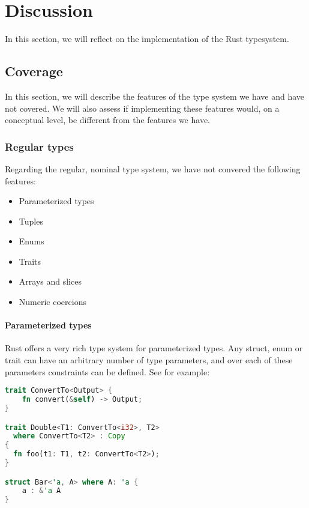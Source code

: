 \section{Discussion}\label{s:discussion}


In this section, we will reflect on the implementation of the Rust typesystem.

\subsection{Coverage}

In this section, we will describe the features of the type system we have and have not covered. We will also assess if implementing these features would, on a conceptual level, be different from the features we have.

\subsubsection{Regular types}

Regarding the regular, nominal type system, we have not convered the following features:

\begin{itemize}
	\item Parameterized types
	\item Tuples
	\item Enums
	\item Traits
	\item Arrays and slices
	\item Numeric coercions
\end{itemize}

\paragraph{Parameterized types}

Rust offers a very rich type system for parameterized types. Any struct, enum or trait can have an arbitrary number of type parameters, and over each of these parameters constraints can be defined. See for example:

\begin{lstlisting}[language=rust, showstringspaces=false, escapechar=~, label={lst:param_constraints}, caption={Example of complex parametric constraints}]
trait ConvertTo<Output> {
    fn convert(&self) -> Output;
}

trait Double<T1: ConvertTo<i32>, T2> 
  where ConvertTo<T2> : Copy
{
  fn foo(t1: T1, t2: ConvertTo<T2>);
}

struct Bar<'a, A> where A: 'a {
    a : &'a A
}
\end{lstlisting}


